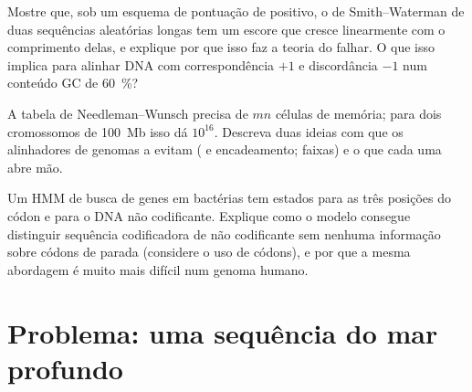 \begin{exercise}[$\star\star\star$]\label{exo:b3:bioinformatics:10}
Mostre que, sob um esquema de pontuação de  positivo, o
 de Smith--Waterman de duas sequências aleatórias
longas tem um escore que cresce linearmente com o comprimento delas, e
explique por que isso faz a teoria do  falhar. O que isso
implica para alinhar DNA com correspondência $+1$ e discordância $-1$
num conteúdo GC de \qty{60}{\%}?
\end{exercise}

\begin{exercise}[$\star\star\star$]\label{exo:b3:bioinformatics:11}
A tabela de Needleman--Wunsch precisa de $mn$ células de memória; para
dois cromossomos de \qty{100}{Mb} isso dá $10^{16}$. Descreva duas
ideias com que os alinhadores de genomas a evitam ( e
encadeamento; faixas) e o que cada uma abre mão.
\end{exercise}

\begin{exercise}[$\star\star\star$]\label{exo:b3:bioinformatics:12}
Um HMM de busca de genes em bactérias tem estados para as três posições
do códon e para o DNA não codificante. Explique como o modelo consegue
distinguir sequência codificadora de não codificante sem nenhuma
informação sobre códons de parada (considere o uso de códons), e por
que a mesma abordagem é muito mais difícil num genoma humano.
\end{exercise}

\section{Problema: uma sequência do mar profundo}

